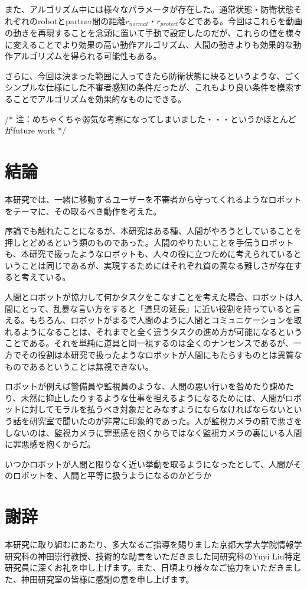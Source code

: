 \documentclass{kuisthesis}
\begin{document}
また、アルゴリズム中には様々なパラメータが存在した。通常状態・防衛状態それぞれのrobotとpartner間の距離$r_{normal}$・$r_{protect}$などである。今回はこれらを動画の動きを再現することを念頭に置いて手動で設定したのだが、これらの値を様々に変えることでより効果の高い動作アルゴリズム、人間の動きよりも効果的な動作アルゴリズムを得られる可能性もある。

さらに、今回は決まった範囲に入ってきたら防衛状態に映るというような、ごくシンプルな仕様にした不審者感知の条件だったが、これもより良い条件を模索することでアルゴリズムを効果的なものにできる。

/* 注：めちゃくちゃ弱気な考察になってしまいました・・・というかほとんどがfuture work */


\section{結論}
本研究では、一緒に移動するユーザーを不審者から守ってくれるようなロボットをテーマに、その取るべき動作を考えた。

序論でも触れたことになるが、本研究はある種、人間がやろうとしていることを押しとどめるという類のものであった。人間のやりたいことを手伝うロボットも、本研究で扱ったようなロボットも、人々の役に立つために考えられているということは同じであるが、実現するためにはそれぞれ質の異なる難しさが存在すると考えている。

人間とロボットが協力して何かタスクをこなすことを考えた場合、ロボットは人間にとって、乱暴な言い方をすると「道具の延長」に近い役割を持っていると言える。もちろん、ロボットがまるで人間のように人間とコミュニケーションを取れるようになることは、それまでと全く違うタスクの進め方が可能になるということである。それを単純に道具と同一視するのは全くのナンセンスであるが、一方でその役割は本研究で扱ったようなロボットが人間にもたらすものとは異質なものであるということは無視できない。

ロボットが例えば警備員や監視員のような、人間の悪い行いを咎めたり諌めたり、未然に抑止したりするような仕事を担えるようになるためには、人間がロボットに対してモラルを払うべき対象だとみなすようにならなければならないという話を研究室で聞いたのが非常に印象的であった。人が監視カメラの前で悪さをしないのは、監視カメラに罪悪感を抱くからではなく監視カメラの裏にいる人間に罪悪感を抱くからだ。

いつかロボットが人間と限りなく近い挙動を取るようになったとして、人間がそのロボットを、人間と平等に扱うようになるのかどうか

\section{謝辞}
本研究に取り組むにあたり、多大なるご指導を賜りました京都大学大学院情報学研究科の神田崇行教授、技術的な助言をいただきました同研究科のYuyi Liu特定研究員に深くお礼を申し上げます。また、日頃より様々なご協力をいただきました、神田研究室の皆様に感謝の意を申し上げます。
\end{document}
